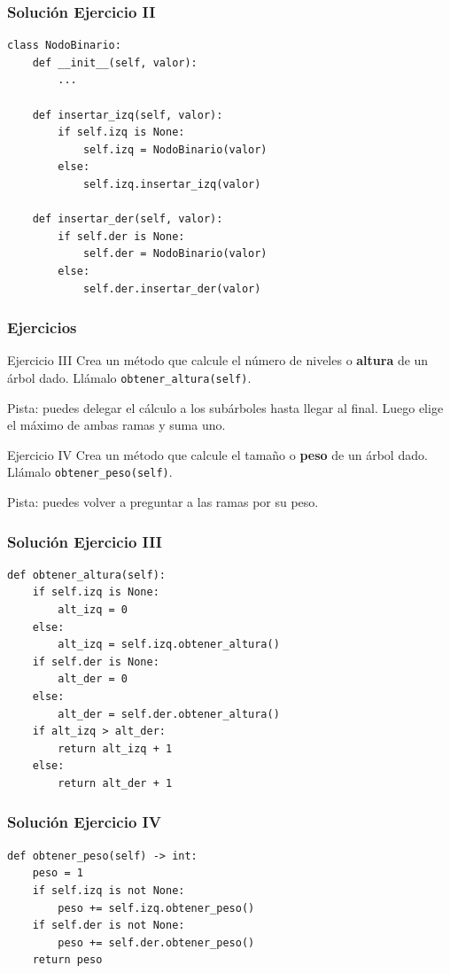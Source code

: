 \documentclass[11pt]{beamer}
\begin{document}
	\begin{frame}[fragile]\frametitle{Solución Ejercicio II}
	\begin{lstlisting}
class NodoBinario:
    def __init__(self, valor):
        ...
        
    def insertar_izq(self, valor):
        if self.izq is None:
            self.izq = NodoBinario(valor)
        else:
            self.izq.insertar_izq(valor)
            
    def insertar_der(self, valor):
        if self.der is None:
            self.der = NodoBinario(valor)
        else:
            self.der.insertar_der(valor)
\end{lstlisting}
	\end{frame}

	\begin{frame}\frametitle{Ejercicios}
	\begin{block}{Ejercicio III}
	Crea un método que calcule el número de niveles o \textbf{altura} de un árbol dado. Llámalo \lstinline|obtener_altura(self)|.

	Pista: puedes delegar el cálculo a los subárboles hasta llegar al final. Luego elige el máximo de ambas ramas y suma uno.
	\end{block}
	\begin{block}{Ejercicio IV}
	Crea un método que calcule el tamaño o \textbf{peso} de un árbol dado. Llámalo \lstinline|obtener_peso(self)|.

	Pista: puedes volver a preguntar a las ramas por su peso.
	\end{block}
	\end{frame}

	\begin{frame}[fragile]\frametitle{Solución Ejercicio III}
	\begin{lstlisting}
def obtener_altura(self):
    if self.izq is None:
        alt_izq = 0
    else:
        alt_izq = self.izq.obtener_altura()
    if self.der is None:
        alt_der = 0
    else:
        alt_der = self.der.obtener_altura()
    if alt_izq > alt_der:
        return alt_izq + 1
    else:
        return alt_der + 1
\end{lstlisting}
	\end{frame}

	\begin{frame}[fragile]\frametitle{Solución Ejercicio IV}
	\begin{lstlisting}
def obtener_peso(self) -> int:
    peso = 1
    if self.izq is not None:
        peso += self.izq.obtener_peso()
    if self.der is not None:
        peso += self.der.obtener_peso()
    return peso
\end{lstlisting}
	\end{frame}
\end{document}
